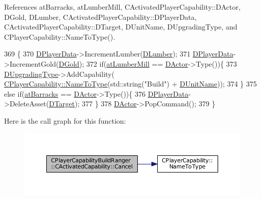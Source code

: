 References at\+Barracks, at\+Lumber\+Mill, C\+Activated\+Player\+Capability\+::\+D\+Actor, D\+Gold, D\+Lumber, C\+Activated\+Player\+Capability\+::\+D\+Player\+Data, C\+Activated\+Player\+Capability\+::\+D\+Target, D\+Unit\+Name, D\+Upgrading\+Type, and C\+Player\+Capability\+::\+Name\+To\+Type().


\begin{DoxyCode}
369                                                              \{
370     \hyperlink{classCActivatedPlayerCapability_a9bf27c322a73f4b11c8183cc1973c3d8}{DPlayerData}->IncrementLumber(\hyperlink{classCPlayerCapabilityBuildRanger_1_1CActivatedCapability_a149028982faf1d393580d5d57bf4da03}{DLumber});
371     \hyperlink{classCActivatedPlayerCapability_a9bf27c322a73f4b11c8183cc1973c3d8}{DPlayerData}->IncrementGold(\hyperlink{classCPlayerCapabilityBuildRanger_1_1CActivatedCapability_a1943b07bf35da2a475fd1bb36ca777ab}{DGold});
372     \textcolor{keywordflow}{if}(\hyperlink{GameDataTypes_8h_a5600d4fc433b83300308921974477feca7bb38316bc3193b5c9ec67ea6aad549c}{atLumberMill} == \hyperlink{classCActivatedPlayerCapability_a54ca944b47bff2718330639941d402b0}{DActor}->Type())\{
373         \hyperlink{classCPlayerCapabilityBuildRanger_1_1CActivatedCapability_a86cf7894dce398e7c5f4642e57e31682}{DUpgradingType}->AddCapability(
      \hyperlink{classCPlayerCapability_a920a696526e8a839f728192aea0ba1c5}{CPlayerCapability::NameToType}(std::string(\textcolor{stringliteral}{"Build"}) + 
      \hyperlink{classCPlayerCapabilityBuildRanger_1_1CActivatedCapability_a0914856622c9b77b9943add2491c97be}{DUnitName}));
374     \}
375     \textcolor{keywordflow}{else} \textcolor{keywordflow}{if}(\hyperlink{GameDataTypes_8h_a5600d4fc433b83300308921974477feca1cbf6c944f30d615a247eef1f57b2230}{atBarracks} == \hyperlink{classCActivatedPlayerCapability_a54ca944b47bff2718330639941d402b0}{DActor}->Type())\{
376         \hyperlink{classCActivatedPlayerCapability_a9bf27c322a73f4b11c8183cc1973c3d8}{DPlayerData}->DeleteAsset(\hyperlink{classCActivatedPlayerCapability_a8a1cf50b6501bcfd55af0c935828e395}{DTarget});
377     \}
378     \hyperlink{classCActivatedPlayerCapability_a54ca944b47bff2718330639941d402b0}{DActor}->PopCommand();
379 \}
\end{DoxyCode}
Here is the call graph for this function\+:\nopagebreak
\begin{figure}[H]
\begin{center}
\leavevmode
\includegraphics[width=350pt]{classCPlayerCapabilityBuildRanger_1_1CActivatedCapability_a46a5240502d6a8de65d3d56bbda8bf91_cgraph}
\end{center}
\end{figure}
